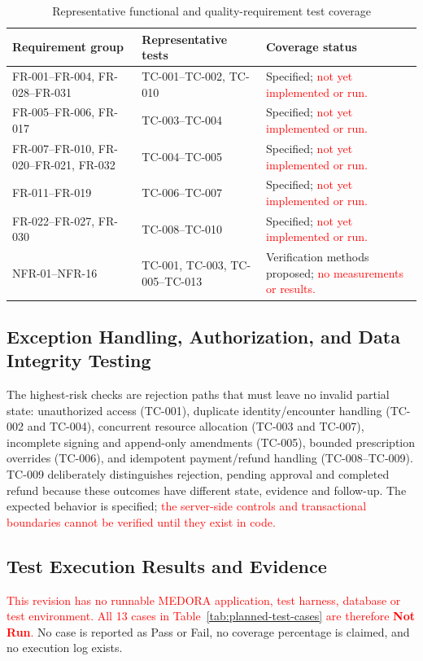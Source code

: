 \documentclass[a4paper,12pt]{article}
\newcommand{\weak}[1]{\textcolor{red}{#1}}
\begin{document}
\begin{table}[H]
\centering
\small
\renewcommand{\arraystretch}{1.10}
\begin{tabularx}{\textwidth}{@{}P{0.27\textwidth}P{0.28\textwidth}Y@{}}
\toprule
Requirement group & Representative tests & Coverage status \\
\midrule
FR-001--FR-004, FR-028--FR-031 & TC-001--TC-002, TC-010 & Specified; \weak{not yet implemented or run.} \\
FR-005--FR-006, FR-017 & TC-003--TC-004 & Specified; \weak{not yet implemented or run.} \\
FR-007--FR-010, FR-020--FR-021, FR-032 & TC-004--TC-005 & Specified; \weak{not yet implemented or run.} \\
FR-011--FR-019 & TC-006--TC-007 & Specified; \weak{not yet implemented or run.} \\
FR-022--FR-027, FR-030 & TC-008--TC-010 & Specified; \weak{not yet implemented or run.} \\
NFR-01--NFR-16 & TC-001, TC-003, TC-005--TC-013 & Verification methods proposed; \weak{no measurements or results.} \\
\bottomrule
\end{tabularx}
\caption{Representative functional and quality-requirement test coverage}
\label{tab:test-coverage}
\end{table}

\subsection{Exception Handling, Authorization, and Data Integrity Testing}
The highest-risk checks are rejection paths that must leave no invalid partial state: unauthorized access (TC-001), duplicate identity/encounter handling (TC-002 and TC-004), concurrent resource allocation (TC-003 and TC-007), incomplete signing and append-only amendments (TC-005), bounded prescription overrides (TC-006), and idempotent payment/refund handling (TC-008--TC-009). TC-009 deliberately distinguishes rejection, pending approval and completed refund because these outcomes have different state, evidence and follow-up. The expected behavior is specified; \weak{the server-side controls and transactional boundaries cannot be verified until they exist in code.}

\subsection{Test Execution Results and Evidence}
\begin{warningbox}
\weak{This revision has no runnable MEDORA application, test harness, database or test environment. All 13 cases in Table~\ref{tab:planned-test-cases} are therefore \textbf{Not Run}.} No case is reported as Pass or Fail, no coverage percentage is claimed, and no execution log exists.
\end{warningbox}
\end{document}
